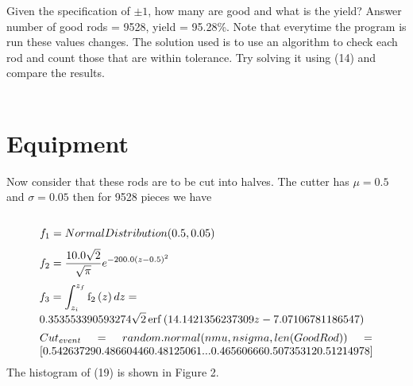 \documentclass[10pt,a4paper]{article}
\begin{document}
\noindent Given the specification of $\pm 1$, how many are good and what is the    yield? 
\noindent Answer number of good rods = 9528, yield = 95.28\%. Note that everytime the program is run these    values changes. The solution used is to use an algorithm to check each    rod and count those that are within tolerance. Try solving it using (14)    and compare the results. \\ \\ \section{Equipment}    Now consider that these rods are to be cut into    halves. The cutter has $\mu = 0.5 $ and $\sigma = 0.05 $ then for 9528 pieces we have \\ \\ 
\begin{equation}
\begin{minipage}{300pt}
 $\displaystyle f_{1} = NormalDistribution(0.5, 0.05)$  
\end{minipage}
\end{equation}
\begin{equation}
\begin{minipage}{300pt}
 $\displaystyle f_{2} = \frac{10.0 \sqrt{2}}{\sqrt{\pi}} e^{- 200.0 \left(z - 0.5\right)^{2}}$  
\end{minipage}
\end{equation}
\begin{equation}
\begin{minipage}{300pt}
 $\displaystyle f_{3} = \int_{z_{i}}^{z_{f}} \operatorname{f_{2}}{\left (z \right )}\, dz = \\ 0.353553390593274 \sqrt{2} \operatorname{erf}{\left (14.1421356237309 z - 7.07106781186547 \right )}$  
\end{minipage}
\end{equation}
\begin{equation}
\begin{minipage}{300pt}
 $\displaystyle Cut_{event} = random.normal(nmu, nsigma, len(GoodRod)) = [0.54263729 0.48660446 0.48125061 ... 0.46560666 0.50735312 0.51214978]$  
\end{minipage}
\end{equation}
\noindent The histogram of (19) is shown in Figure 2.
\end{document}
